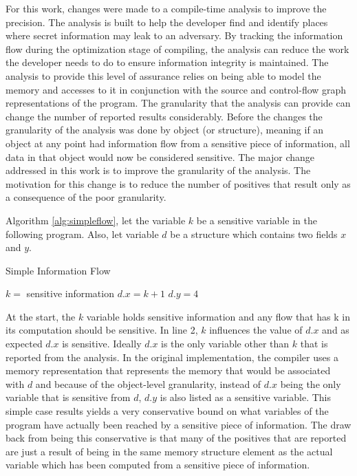\documentclass[11pt,a4paper]{article}
\begin{document}
  For this work, changes were made to a compile-time analysis to improve
  the precision. The analysis is built to help the developer find and identify
  places where secret information may leak to an adversary. By tracking the
  information flow during the optimization stage of compiling, the analysis can
  reduce the work the developer needs to do to ensure information integrity is
  maintained. The analysis to provide this level of assurance relies on being
  able to model the memory and accesses to it in conjunction with the source
  and control-flow graph representations of the program. The granularity
  that the analysis can provide can change the number of reported results
  considerably. Before the changes the granularity of the analysis was done
  by object (or structure), meaning if an object at any point had information
  flow from a sensitive piece of information, all data in that object would
  now be considered sensitive. The major change addressed in this work is to
  improve the granularity of the analysis. The motivation for this change is
  to reduce the number of positives that result only as a consequence of the
  poor granularity.


  Algorithm \ref{alg:simpleflow}, let the variable $k$ be a sensitive variable in the following program. Also, let
  variable $d$ be a structure which contains two fields $x$ and $y$. 

  \begin{algorithm}
    \caption{Simple Information Flow}
    \label{alg:simpleflow}
  \begin{algorithmic}
    \State $k =$ sensitive information
    \State $d.x =  k + 1$
    \State $d.y = 4$
  \end{algorithmic}
  \end{algorithm}

  \begin{algorithm}

  \end{algorithm}

  At the start, the $k$ variable holds sensitive information and any flow that has k
  in its computation should be sensitive. In line 2, $k$ influences the value of $d.x$
  and as expected $d.x$ is sensitive. Ideally $d.x$ is the only variable other
  than $k$ that is reported from the analysis. In the original implementation,
  the compiler uses a memory representation that represents the memory that would
  be associated with $d$ and because of the object-level granularity, instead of
  $d.x$ being the only variable that is sensitive from $d$, $d.y$ is also listed
  as a sensitive variable. This simple case results yields a very conservative
  bound on what variables of the program have actually been reached by a sensitive
  piece of information. The draw back from being this conservative is that many of
  the positives that are reported are just a result of being in the same memory
  structure element as the actual variable which has been computed from a
  sensitive piece of information.
\end{document}
